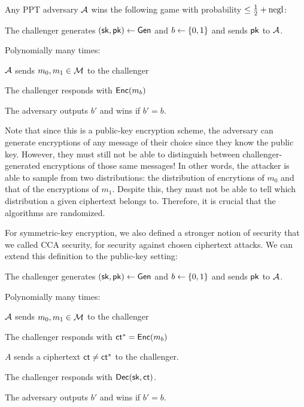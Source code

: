 \begin{definition}
	Any PPT adversary $\mathcal{A}$ wins the following game with probability $\leq \tfrac{1}{2} + \operatorname{negl}$:

	\begin{compactitem}
		\item The challenger generates $({\mathsf{sk}}, \mathsf{pk}) \gets \mathsf{Gen}$ and $b \gets \{0,1\}$ and sends $\mathsf{pk}$ to $\mathcal{A}$.
		\item Polynomially many times:
			\begin{compactitem}
			\item $\mathcal{A}$ sends $m_0, m_1 \in \mathcal{M}$ to the challenger
			\item The challenger responds with $\mathsf{Enc}(m_b)$		
			\end{compactitem}
		\item The adversary outputs $b'$ and wins if $b' = b$.
	\end{compactitem}
\end{definition}
	Note that since this is a public-key encryption scheme, the adversary can generate encryptions of any message of their choice since they know the public key. However, they must still not be able to distinguish between challenger-generated encryptions of those same messages! In other words, the attacker is able to sample from two distributions: the distribution of encrytions of $m_0$ and that of the encryptions of $m_1$. Despite this, they must not be able to tell which distribution a given ciphertext belongs to. Therefore, it is crucial that the algorithms are randomized.

For symmetric-key encryption, we also defined a stronger notion of security that we called CCA security, for security against chosen ciphertext attacks. We can extend this definition to the public-key setting:

\begin{definition}
\begin{compactitem}
	\item The challenger generates $({\mathsf{sk}}, \mathsf{pk}) \gets \mathsf{Gen}$ and $b \gets \{0,1\}$ and sends $\mathsf{pk}$ to $\mathcal{A}$.
	\item Polynomially many times:
		\begin{compactitem}
		\item $\mathcal{A}$ sends $m_0, m_1 \in \mathcal{M}$ to the challenger
		\item The challenger responds with $\mathsf{ct}^* = \mathsf{Enc}(m_b)$		
		\item $A$ sends a ciphertext $\mathsf{ct} \neq \mathsf{ct}^*$ to the challenger.
		\item The challenger responds with $\mathsf{Dec}({\mathsf{sk}}, \mathsf{ct})$.
		\end{compactitem}
	\item The adversary outputs $b'$ and wins if $b' = b$.
\end{compactitem}
\end{definition}

